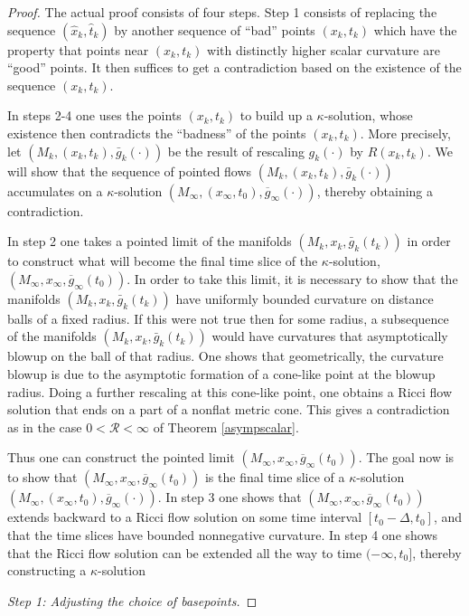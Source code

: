 \documentclass[12pt]{amsart}
\numberwithin{equation}{section}
\theoremstyle{plain}
\theoremstyle{definition}
\theoremstyle{remark}
\begin{document}
\begin{proof}
The actual proof consists of four steps. 
Step 1 consists of replacing the sequence $(\widehat{x}_k, \widehat{t}_k)$
by another sequence of ``bad'' points $(x_k, t_k)$ which have the
property that points near
$(x_k, t_k)$ with distinctly higher scalar curvature are ``good'' points.
It then suffices to get a contradiction based on the existence of the
sequence $(x_k, t_k)$. 

In steps 2-4 one uses the points $(x_k, t_k)$
to build up a $\kappa$-solution, whose existence then contradicts the
``badness'' of the points $(x_k, t_k)$. 
More precisely, let
$(M_k,(x_k,t_k),\bar g_k(\cdot))$ be the result of rescaling $g_k(\cdot)$
by $R(x_k,t_k)$.
We will show that the sequence of pointed
flows $(M_k,(x_k,t_k),\bar g_k(\cdot))$ accumulates on a $\kappa$-solution
$(M_\infty, (x_\infty, t_0), \overline{g}_\infty(\cdot))$,
thereby obtaining a contradiction. 

In step 2 one takes a pointed limit of the manifolds
$(M_k, x_k,\bar g_k(t_k))$ in order to construct what
will become the final time slice of the $\kappa$-solution,
$(M_\infty, x_\infty, \overline{g}_\infty(t_0))$. In order to take this
limit, it is necessary to show that the manifolds 
$(M_k, x_k,\bar g_k(t_k))$ have uniformly bounded curvature on distance
balls of a fixed radius.  If this were not true then for some radius, 
a subsequence of the
manifolds $(M_k, x_k,\bar g_k(t_k))$ would have curvatures that
asymptotically blowup on the ball of that radius.  One shows that
geometrically, the curvature blowup is due to the asymptotic formation of 
a cone-like point at the blowup radius.  Doing a further
rescaling at this cone-like point, one obtains a Ricci flow solution
that ends on a part of a nonflat metric cone. This gives a contradiction
as in the case $0 < {\mathcal R} < \infty$ of Theorem \ref{asympscalar}.

Thus one can construct the pointed limit
$(M_\infty, x_\infty, \overline{g}_\infty(t_0))$. The goal now is
to show that $(M_\infty, x_\infty, \overline{g}_\infty(t_0))$ is the
final time slice of a $\kappa$-solution 
$(M_\infty, (x_\infty, t_0), \overline{g}_\infty(\cdot))$. In step 3
one shows that $(M_\infty, x_\infty, \overline{g}_\infty(t_0))$ extends
backward
to a Ricci flow solution on some time interval $[t_0 - \Delta, t_0]$, 
and that
the time slices have bounded nonnegative curvature.  In step 4 one
shows that the Ricci flow solution can be extended all the way to time 
$(-\infty, t_0]$, thereby constructing a $\kappa$-solution

\bigskip
{\em Step 1: Adjusting the choice of basepoints.}


\end{proof}
\end{document}
